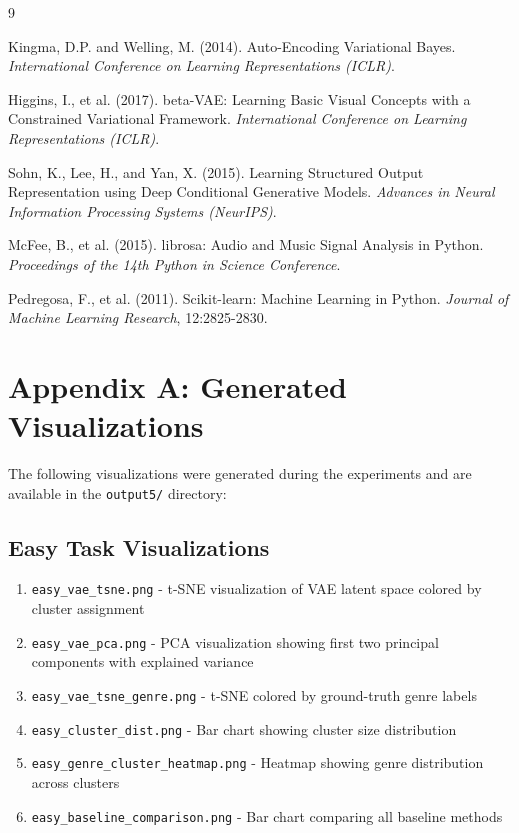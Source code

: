 \documentclass{article}
\begin{document}

\begin{thebibliography}{9}

Kingma, D.P. and Welling, M. (2014).
Auto-Encoding Variational Bayes.
\textit{International Conference on Learning Representations (ICLR)}.

Higgins, I., et al. (2017).
beta-VAE: Learning Basic Visual Concepts with a Constrained Variational Framework.
\textit{International Conference on Learning Representations (ICLR)}.

Sohn, K., Lee, H., and Yan, X. (2015).
Learning Structured Output Representation using Deep Conditional Generative Models.
\textit{Advances in Neural Information Processing Systems (NeurIPS)}.

McFee, B., et al. (2015).
librosa: Audio and Music Signal Analysis in Python.
\textit{Proceedings of the 14th Python in Science Conference}.

Pedregosa, F., et al. (2011).
Scikit-learn: Machine Learning in Python.
\textit{Journal of Machine Learning Research}, 12:2825-2830.

\end{thebibliography}

\appendix
\section{Appendix A: Generated Visualizations}

The following visualizations were generated during the experiments and are available in the \texttt{output5/} directory:

\subsection{Easy Task Visualizations}
\begin{enumerate}
    \item \texttt{easy\_vae\_tsne.png} - t-SNE visualization of VAE latent space colored by cluster assignment
    \item \texttt{easy\_vae\_pca.png} - PCA visualization showing first two principal components with explained variance
    \item \texttt{easy\_vae\_tsne\_genre.png} - t-SNE colored by ground-truth genre labels
    \item \texttt{easy\_cluster\_dist.png} - Bar chart showing cluster size distribution
    \item \texttt{easy\_genre\_cluster\_heatmap.png} - Heatmap showing genre distribution across clusters
    \item \texttt{easy\_baseline\_comparison.png} - Bar chart comparing all baseline methods
\end{enumerate}
\end{document}
